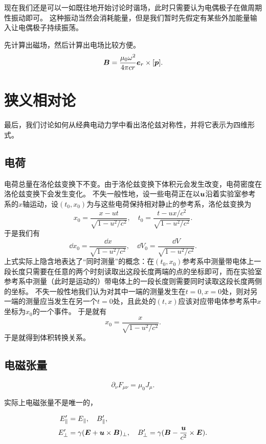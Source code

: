 \documentclass[UTF8, a4paper]{ctexart}
\begin{document}
现在我们还是可以一如既往地开始讨论时谐场，此时只需要认为电偶极子在做周期性振动即可。
这种振动当然会消耗能量，但是我们暂时先假定有某些外加能量输入让电偶极子持续振荡。

先计算出磁场，然后计算出电场比较方便。
\begin{equation}
    \vb*{B} = \frac{\mu_0 \omega^2}{4\pi c r} \vb*{e}_r \times [\vb*{p}].
\end{equation}

\section{狭义相对论}

最后，我们讨论如何从经典电动力学中看出洛伦兹对称性，并将它表示为四维形式。

\subsection{电荷}

电荷总量在洛伦兹变换下不变。由于洛伦兹变换下体积元会发生改变，电荷密度在洛伦兹变换下会发生变化。
不失一般性地，设一些电荷正在以$\vb*{u}$沿着实验室参考系的$x$轴运动，设$(t_0, x_0)$为与这些电荷保持相对静止的参考系，洛伦兹变换为
\[
    x_0 = \frac{x - ut}{\sqrt{1 - u^2/c^2}}, \quad t_0 = \frac{t - ux / c^2}{\sqrt{1 - u^2 / c^2}}.
\]
于是我们有
\[
    \dd{x_0} = \frac{\dd{x}}{\sqrt{1 - u^2/c^2}}, \quad \dd{V_0} = \frac{\dd{V}}{\sqrt{1 - u^2/c^2}}.
\]
上式实际上隐含地表达了“同时测量”的概念：在$(t_0, x_0)$参考系中测量带电体上一段长度只需要在任意的两个时刻读取出这段长度两端的点的坐标即可，而在实验室参考系中测量（此时是运动的）带电体上的一段长度则需要同时读取这段长度两侧的坐标。
不失一般性地我们认为对其中一端的测量发生在$t=0, x=0$处，则对另一端的测量应当发生在另一个$t=0$处，且此处的$(t, x)$应该对应带电体参考系中$x$坐标为$x_0$的一个事件。
于是就有
\[
    x_0 = \frac{x}{\sqrt{1 - u^2/c^2}}.
\]
于是就得到体积转换关系。

\subsection{电磁张量}

\begin{equation}
    \partial_\nu F_{\mu \nu} = \mu_0 J_\mu.
\end{equation}

实际上电磁张量不是唯一的，

\begin{equation}
    \begin{aligned}
        E_\parallel' &= E_\parallel, \quad B_\parallel' , \\
        E_\bot' &= \gamma (\vb*{E} + \vb*{u} \times \vb*{B})_\bot, \quad B_\bot' = \gamma (\vb*{B} - \frac{\vb*{u}}{c^2} \times \vb*{E}).
    \end{aligned}
\end{equation}
\end{document}
